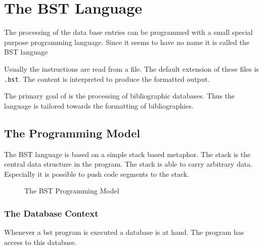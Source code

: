 
\chapter{The BST Language}%

%
The processing of the data base entries can be programmed with a small
special purpose programming language. Since it seems to have no name
it is called the BST language

Usually the instructions are read from a file. The default extension
of these files is \texttt{.bst}. The content is interpreted to produce
the formatted output.

The primary goal of \BibTeX{} is the processing of
bibliographic databases. Thus the language is tailored towards the
formatting of bibliographies.


\def\cmdIndex#1{\index{#1@\texttt{#1}}}%
\def\fctIndex#1{\index{#1@\texttt{#1}}%
  \index{function!#1@\texttt{#1}}}%
\def\varIndex#1{\index{#1@\texttt{#1}}%
  \index{variable!#1@\texttt{#1}}}%

\section{The Programming Model}

The BST language is based on a simple stack based metaphor. The stack
is the central data structure in the program. The stack is able to
carry arbitrary data. Especially it is possible to push code segments
to the stack.

\begin{figure}[tb]
  \centering
  
  \caption{The BST Programming Model}
  \label{fig:bst-model}
\end{figure}


\subsection{The Database Context}

Whenever a bst program is executed a database is at hand. The program
has access to this database.

\INCOMPLETE

